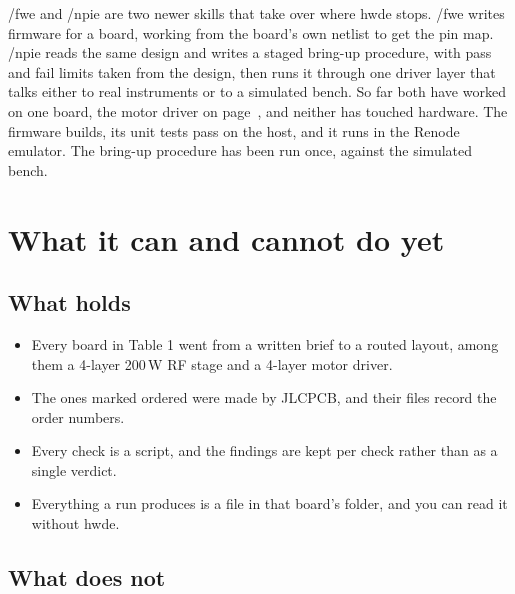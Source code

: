 \documentclass[11pt]{article}
\begin{document}
/fwe and /npie are two newer skills that take over where hwde stops. /fwe
writes firmware for a board, working from the board's own netlist to get the
pin map. /npie reads the same design and writes a staged bring-up procedure,
with pass and fail limits taken from the design, then runs it through one
driver layer that talks either to real instruments or to a simulated bench. So
far both have worked on one board, the motor driver on
page~\pageref{pg:bldc}, and neither has touched hardware. The firmware builds,
its unit tests pass on the host, and it runs in the Renode emulator. The
bring-up procedure has been run once, against the simulated bench.

\newpage



\section{What it can and cannot do yet}

\subsection{What holds}

\begin{itemize}[leftmargin=12pt,itemsep=2pt]
\item Every board in Table 1 went from a written brief to a routed layout,
      among them a 4-layer 200\,W RF stage and a 4-layer motor driver.
\item The ones marked ordered were made by JLCPCB, and their files record
      the order numbers.
\item Every check is a script, and the findings are kept per check rather
      than as a single verdict.
\item Everything a run produces is a file in that board's folder, and you can
      read it without hwde.
\end{itemize}

\subsection{What does not}
\end{document}
